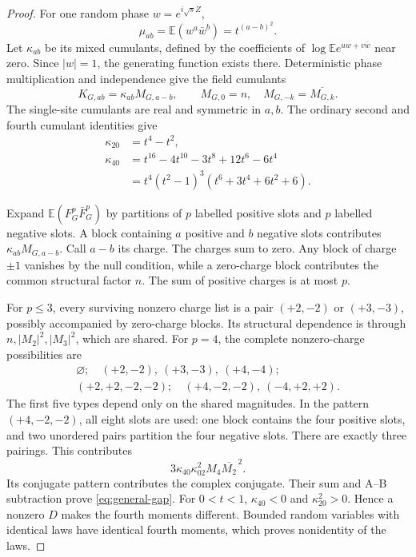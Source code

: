 \documentclass[11pt]{article}
\newcommand{\E}{\mathbb E}
\begin{document}
\begin{proof}
For one random phase $w=e^{i\sqrt{s}Z}$,
\[
 \mu_{ab}=\E(w^a\bar w^b)=t^{(a-b)^2}.
\]
Let $\kappa_{ab}$ be its mixed cumulants, defined by the coefficients of
$\log\E e^{uw+v\bar w}$ near zero. Since $|w|=1$, the generating function
exists there. Deterministic phase multiplication and independence give the
field cumulants
\[
 K_{G,ab}=\kappa_{ab}M_{G,a-b},\qquad
 M_{G,0}=n,\quad M_{G,-k}=\overline{M_{G,k}}.
\]
The single-site cumulants are real and symmetric in $a,b$. The ordinary
second and fourth cumulant identities give
\begin{align*}
 \kappa_{20}&=t^4-t^2,\\
 \kappa_{40}&=t^{16}-4t^{10}-3t^8+12t^6-6t^4\\
 &=t^4(t^2-1)^3(t^6+3t^4+6t^2+6).
\end{align*}

Expand $\E(F_G^p\bar F_G^p)$ by partitions of $p$ labelled positive slots
and $p$ labelled negative slots. A block containing $a$ positive and $b$
negative slots contributes $\kappa_{ab}M_{G,a-b}$. Call $a-b$ its charge.
The charges sum to zero. Any block of charge $\pm1$ vanishes by the null
condition, while a zero-charge block contributes the common structural
factor $n$. The sum of positive charges is at most $p$.

For $p\le3$, every surviving nonzero charge list is a pair $(+2,-2)$ or
$(+3,-3)$, possibly accompanied by zero-charge blocks. Its structural
dependence is through $n,|M_2|^2,|M_3|^2$, which are shared.
For $p=4$, the complete nonzero-charge possibilities are
\[
 \begin{gathered}
 \varnothing;\quad (+2,-2),\ (+3,-3),\ (+4,-4);\\
 (+2,+2,-2,-2);\quad (+4,-2,-2),\ (-4,+2,+2).
 \end{gathered}
\]
The first five types depend only on the shared magnitudes. In the pattern
$(+4,-2,-2)$, all eight slots are used: one block contains the four positive
slots, and two unordered pairs partition the four negative slots. There are
exactly three pairings. This contributes
\[
 3\kappa_{40}\kappa_{02}^2M_4\overline{M_2}^{\,2}.
\]
Its conjugate pattern contributes the complex conjugate. Their sum and A--B
subtraction prove \eqref{eq:general-gap}. For $0<t<1$, $\kappa_{40}<0$ and
$\kappa_{20}^2>0$. Hence a nonzero $D$ makes the fourth moments different.
Bounded random variables with identical laws have identical fourth moments,
which proves nonidentity of the laws.
\end{proof}
\end{document}
